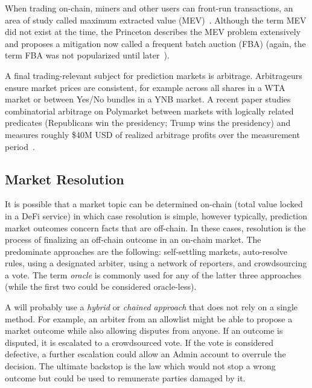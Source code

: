 When trading on-chain, miners and other users can front-run transactions, an area of study called maximum extracted value (MEV)~\cite{BBDGJKLZ19}. Although the term MEV did not exist at the time, the Princeton \depm describes the MEV problem extensively~\cite{BCFKMN14} and proposes a mitigation now called a frequent batch auction (FBA) (again, the term FBA was not popularized until later~\cite{BCS15}).

A final trading-relevant subject for prediction markets is arbitrage. Arbitrageurs ensure market prices are consistent, for example across all shares in a WTA market or between Yes/No bundles in a YNB market. A recent paper studies combinatorial arbitrage on Polymarket between markets with logically related predicates (\eg Republicans win the presidency; Trump wins the presidency) and measures roughly \$40M USD of realized arbitrage profits over the measurement period~\cite{SGKS25}. 


\subsection{Market Resolution}\label{wf:close}

It is possible that a market topic can be determined on-chain (\eg total value locked in a DeFi service) in which case resolution is simple, however typically, prediction market outcomes concern facts that are off-chain. In these cases, resolution is the process of finalizing an off-chain outcome in an on-chain market. The predominate approaches are the following: self-settling markets, auto-resolve rules, using a designated arbiter, using a network of reporters, and crowdsourcing a vote. The term \textit{oracle} is commonly used for any of the latter three approaches (while the first two could be considered oracle-less). 

A \depm will probably use a \textit{hybrid} or \textit{chained approach} that does not rely on a single method. For example, an arbiter from an allowlist might be able to propose a market outcome while also allowing disputes from anyone. If an outcome is disputed, it is escalated to a crowdsourced vote. If the vote is considered defective, a further escalation could allow an Admin account to overrule the decision. The ultimate backstop is the law which would not stop a wrong outcome but could be used to remunerate parties damaged by it.

